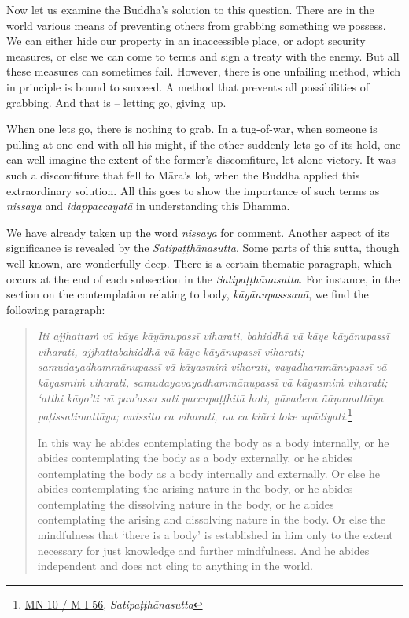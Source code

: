 Now let us examine the Buddha's solution to this question. There are in the world various means of preventing others from grabbing something we possess. We can either hide our property in an inaccessible place, or adopt security measures, or else we can come to terms and sign a treaty with the enemy. But all these measures can sometimes fail. However, there is one unfailing method, which in principle is bound to succeed. A method that prevents all possibilities of grabbing. And that is -- letting go, giving~up.

When one lets go, there is nothing to grab. In a tug-of-war, when someone is pulling at one end with all his might, if the other suddenly lets go of its hold, one can well imagine the extent of the former's discomfiture, let alone victory. It was such a discomfiture that fell to Māra's lot, when the Buddha applied this extraordinary solution. All this goes to show the importance of such terms as \emph{nissaya} and \emph{idappaccayatā} in understanding this Dhamma.

We have already taken up the word \emph{nissaya} for comment. Another aspect of its significance is revealed by the \emph{Satipaṭṭhānasutta}. Some parts of this sutta, though well known, are wonderfully deep. There is a certain thematic paragraph, which occurs at the end of each subsection in the \emph{Satipaṭṭhānasutta}. For instance, in the section on the contemplation relating to body, \emph{kāyānupasssanā}, we find the following paragraph:

\begin{quote}
\emph{Iti ajjhattaṁ vā kāye kāyānupassī viharati, bahiddhā vā kāye kāyānupassī viharati, ajjhattabahiddhā vā kāye kāyānupassī viharati; samudayadhammānupassī vā kāyasmiṁ viharati, vayadhammānupassī vā kāyasmiṁ viharati, samudayavayadhammānupassī vā kāyasmiṁ viharati; `atthi kāyo'ti vā pan'assa sati paccupaṭṭhitā hoti, yāvadeva ñāṇamattāya paṭissatimattāya; anissito ca viharati, na ca kiñci loke upādiyati}.\footnote{\href{https://suttacentral.net/mn10/pli/ms}{MN 10 / M I 56}, \emph{Satipaṭṭhānasutta}}

In this way he abides contemplating the body as a body internally, or he abides contemplating the body as a body externally, or he abides contemplating the body as a body internally and externally. Or else he abides contemplating the arising nature in the body, or he abides contemplating the dissolving nature in the body, or he abides contemplating the arising and dissolving nature in the body. Or else the mindfulness that `there is a body' is established in him only to the extent necessary for just knowledge and further mindfulness. And he abides independent and does not cling to anything in the world.
\end{quote}

